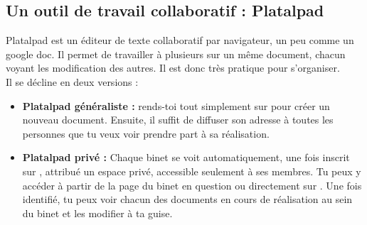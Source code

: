 \subsection{Un outil de travail collaboratif : Platalpad}
\label{platalpad}

Platalpad est un éditeur de texte collaboratif par navigateur, un peu comme un google doc. Il permet de travailler à plusieurs sur un même document, chacun voyant les modification des autres. Il est donc très pratique pour s'organiser.\\
Il se décline en deux versions :
\begin{itemize}

\item \textbf{Platalpad généraliste :} rends-toi tout simplement sur  pour créer un nouveau document. Ensuite, il suffit de diffuser son adresse à toutes les personnes que tu veux voir prendre part à sa réalisation. \\

\item \textbf{Platalpad privé :} Chaque binet se voit automatiquement, une fois inscrit sur \fkz, attribué un espace privé, accessible seulement à ses membres. Tu peux y accéder à partir de la page \fkz du binet en question ou directement sur . Une fois identifié, tu peux voir chacun des documents en cours de réalisation au sein du binet et les modifier à ta guise.

\end{itemize}



